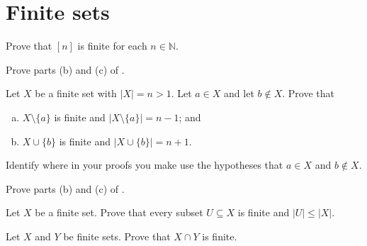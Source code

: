 \section{Finite sets}

\begin{exercise}
\label{exBracketNIsFinite}
Prove that $[n]$ is finite for each $n \in \mathbb{N}$.
\end{exercise}


\begin{exercise}
Prove parts (b) and (c) of .
\end{exercise}


\begin{exercise}
\label{exAddRemoveElementsOfFiniteSets}
Let $X$ be a finite set with $|X| = n > 1$. Let $a \in X$ and let $b \not \in X$. Prove that
\begin{enumerate}[(a)]
\item $X \setminus \{ a \}$ is finite and $|X \setminus \{ a \}| = n-1$; and
\item $X \cup \{ b \}$ is finite and $|X \cup \{ b \}| = n+1$.
\end{enumerate}
Identify where in your proofs you make use the hypotheses that $a \in X$ and $b \not \in X$.
\end{exercise}

\begin{exercise}
Prove parts (b) and (c) of .
\end{exercise}


\begin{exercise}
Let $X$ be a finite set. Prove that every subset $U \subseteq X$ is finite and $|U| \le |X|$.
\end{exercise}

\begin{exercise}
Let $X$ and $Y$ be finite sets. Prove that $X \cap Y$ is finite.
\end{exercise}

